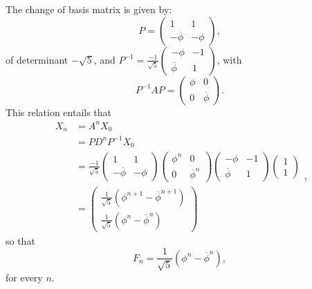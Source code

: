 The change of basis matrix is given by:
\[P=\begin{pmatrix} 1 & 1 \\ -\overline \phi & -\phi \end{pmatrix},\]
of determinant $-\sqrt 5$, and $P^{-1} = \frac{-1}{\sqrt 5}\begin{pmatrix}-\phi & -1 \\ \overline \phi & 1 \end{pmatrix}$, with
\[P^{-1} A P = \begin{pmatrix}\phi & 0 \\ 0 & \overline \phi \end{pmatrix}.\]
This relation entails that 
\[\begin{split} 
X_n  	& = A^n X_0 \\
     	& = P D^n P^{-1} X_0 \\
	& =\frac{-1}{\sqrt 5} \begin{pmatrix} 1 & 1 \\ -\overline \phi & -\phi \end{pmatrix} 
		\begin{pmatrix}\phi^n & 0 \\ 0 & \overline \phi^n \end{pmatrix}
			 \begin{pmatrix}-\phi & -1 \\ \overline \phi & 1 \end{pmatrix} \begin{pmatrix} 1 \\ 1 \end{pmatrix} \\	
	& = \begin{pmatrix} \frac{1}{\sqrt 5}(\phi^{n+1} - {\overline\phi}^{n+1} ) \\ \frac{1}{\sqrt 5}(\phi^n - {\overline\phi}^n ) \end{pmatrix}
\end{split},\]
so that \[F_n = \frac{1}{\sqrt 5}(\phi^n - {\overline\phi}^n ),\]
for every $n$.
